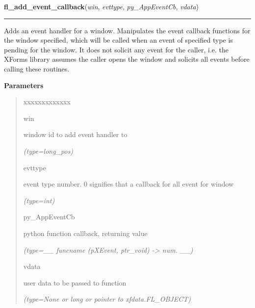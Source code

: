 \hspace{.8\funcindent}\begin{boxedminipage}{\funcwidth}

    \raggedright \textbf{fl\_add\_event\_callback}(\textit{win}, \textit{evttype}, \textit{py\_AppEventCb}, \textit{vdata})

    \vspace{-1.5ex}

    \rule{\textwidth}{0.5\fboxrule}
\setlength{\parskip}{2ex}
    Adds an event handler for a window. Manipulates the event callback 
    functions for the window specified, which will be called when an event 
    of specified type is pending for the window. It does not solicit any 
    event for the caller, i.e. the XForms library assumes the caller opens 
    the window and solicits all events before calling these routines.

\setlength{\parskip}{1ex}
      \textbf{Parameters}
      \vspace{-1ex}

      \begin{quote}
        \begin{Ventry}{xxxxxxxxxxxxx}

          \item[win]

          window id to add event handler to

            {\it (type=long\_pos)}

          \item[evttype]

          event type number. 0 signifies that a callback for all event for 
          window

            {\it (type=int)}

          \item[py\_AppEventCb]

          python function callback, returning value

            {\it (type=\_\_ funcname (pXEvent, ptr\_void) -{\textgreater} num. \_\_)}

          \item[vdata]

          user data to be passed to function

            {\it (type=None or long or pointer to xfdata.FL\_OBJECT)}

        \end{Ventry}

      \end{quote}


\end{boxedminipage}
